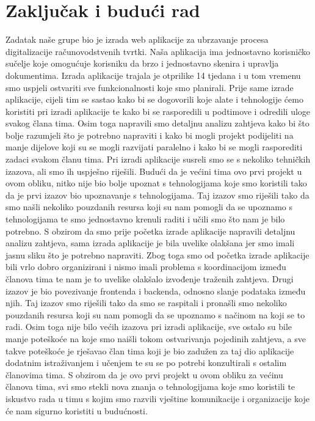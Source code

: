 \chapter{Zaključak i budući rad}

		Zadatak naše grupe bio je izrada web aplikacije za ubrzavanje procesa digitalizacije računovodstvenih tvrtki.
		Naša aplikacija ima jednostavno korisničko sučelje koje omogućuje korisniku da brzo i jednostavno skenira i upravlja dokumentima.
		Izrada aplikacije trajala je otprilike 14 tjedana i u tom vremenu smo uspjeli ostvariti sve funkcionalnosti koje smo planirali.
		Prije same izrade aplikacije, cijeli tim se sastao kako bi se dogovorili koje alate i tehnologije ćemo koristiti pri izradi aplikacije 
		te kako bi se rasporedili u podtimove i odredili uloge svakog člana tima. Osim toga napravili smo detaljnu analizu zahtjeva 
		kako bi što bolje razumjeli što je potrebno napraviti i kako bi mogli projekt podijeliti na manje dijelove koji su se mogli razvijati paralelno
		i kako bi se mogli rasporediti zadaci svakom članu tima. Pri izradi aplikacije susreli smo se s nekoliko tehničkih izazova, ali smo ih uspješno riješili.
		Budući da je većini tima ovo prvi projekt u ovom obliku, nitko nije bio bolje upoznat s tehnologijama koje smo koristili tako da je prvi izazov bio upoznavanje s tehnologijama.
		Taj izazov smo riješili tako da smo našli nekoliko pouzdanih resursa koji su nam pomogli da se upoznamo s tehnologijama te smo jednostavno krenuli raditi i učili smo što nam 
		je bilo potrebno. S obzirom da smo prije početka izrade aplikacije napravili detaljnu analizu zahtjeva, sama izrada aplikacije je bila uvelike olakšana jer smo imali jasnu sliku što je potrebno napraviti.
		Zbog toga smo od početka izrade aplikacije bili vrlo dobro organizirani i nismo imali problema s koordinacijom između članova tima te nam je to uvelike olakšalo izvođenje traženih zahtjeva.
		Drugi izazov je bio povezivanje frontenda i backenda, odnosno slanje podataka između njih. Taj izazov smo riješili tako da smo se raspitali i pronašli smo nekoliko pouzdanih resursa koji su nam pomogli da se upoznamo s načinom na koji se to radi.
		Osim toga nije bilo većih izazova pri izradi aplikacije, sve ostalo su bile manje poteškoće na koje smo naišli tokom ostvarivanja pojedinih zahtjeva, a sve takve poteškoće je rješavao član tima
		koji je bio zadužen za taj dio aplikacije dodatnim istraživanjem i učenjem te su se po potrebi konzultirali s ostalim članovima tima.
		S obzirom da je ovo prvi projekt u ovom obliku za većinu članova tima, svi smo stekli nova znanja o tehnologijama koje smo koristili te 
		iskustvo rada u timu s kojim smo razvili vještine komunikacije i organizacije koje će nam sigurno koristiti u budućnosti.
		
		\eject 